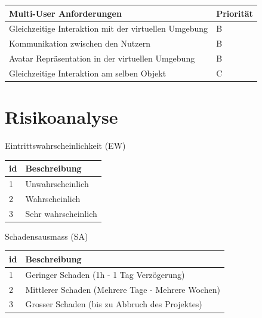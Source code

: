 \begin{center}
	\begin{tabular}	{ |l|l| }
		\hline
		\rowcolor{black}
		\color{white} \textbf{Multi-User Anforderungen} & \color{white} \textbf{Priorität} \\
		\hline
		Gleichzeitige Interaktion mit der virtuellen Umgebung & B \\
		\hline
		Kommunikation zwischen den Nutzern & B \\
		\hline
		Avatar Repräsentation in der virtuellen Umgebung & B \\
		\hline		
		Gleichzeitige Interaktion am selben Objekt & C \\
		\hline
	\end{tabular}
\end{center}
\label{tbl:multi_user_anforderungen}

\pagebreak
\section{Risikoanalyse}
Eintrittswahrscheinlichkeit (EW)
\begin{center}
	\begin{tabular}	{ |l|l| }
		\hline
		\rowcolor{black}
		\color{white} \textbf{id} & \color{white} \textbf{Beschreibung} \\
		\hline
		1 & Unwahrscheinlich \\
		\hline
		2 & Wahrscheinlich \\
		\hline
		3 & Sehr wahrscheinlich \\
		\hline
	\end{tabular}
\end{center}
\label{tbl:eintrittswahrscheinlichkeit}

\bigskip
Schadensausmass (SA)
\begin{center}
	\begin{tabular}	{ |l|l| }
		\hline
		\rowcolor{black}
		\color{white} \textbf{id} & \color{white} \textbf{Beschreibung} \\
		\hline
		1 & Geringer Schaden (1h - 1 Tag Verzögerung) \\
		\hline
		2 & Mittlerer Schaden (Mehrere Tage - Mehrere Wochen) \\
		\hline
		3 & Grosser Schaden (bis zu Abbruch des Projektes) \\
		\hline
	\end{tabular}
\end{center}
\label{tbl:schadensausmass}


